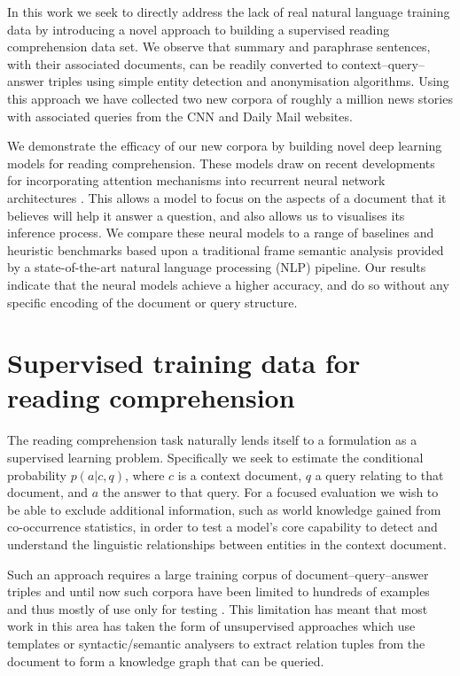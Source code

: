 \documentclass{article}
\begin{document}
In this work we seek to directly address the lack of real natural language
training data by introducing a novel approach to building a supervised reading
comprehension data set. We observe that summary and paraphrase sentences, with
their associated documents, can be readily converted to context--query--answer
triples using simple entity detection and anonymisation algorithms.
Using this approach we have collected two new corpora of roughly a million news
stories with associated queries from the CNN and Daily Mail websites.

We demonstrate the efficacy of our new corpora by building novel deep learning
models for reading comprehension. These models draw on recent developments
for incorporating attention mechanisms into recurrent neural network architectures
\cite{Bahdanau:2014:NMT,Mnih:2014:RMVA,Gregor:2015:DRAW,Sukhbaatar:2015}. This allows a model to
focus on the aspects of a document that it believes will help it answer a
question, and also allows us to visualises its inference process.
We compare these neural models to a range of baselines and heuristic benchmarks
based upon a traditional frame semantic analysis provided by a state-of-the-art
natural language processing (NLP) pipeline. Our results indicate that the neural
models achieve a higher accuracy, and do so without any specific encoding of the
document or query structure.
 \section{Supervised training data for reading comprehension}
\label{data}

The reading comprehension task naturally lends itself to a formulation as a
supervised learning problem. Specifically we seek to estimate the conditional
probability $p(a|c,q)$, where $c$ is a context document, $q$ a query relating to
that document, and $a$ the answer to that query.
For a focused evaluation we wish to be able to exclude additional information,
such as world knowledge gained from co-occurrence statistics, in order to test a
model's core capability to detect and understand the linguistic relationships
between entities in the context document.

Such an approach requires a large training corpus of document--query--answer
triples and until now such corpora have been limited to hundreds of examples and
thus mostly of use only for testing \cite{Richardson:2013:MCT}. This limitation
has meant that most work in this area has taken the form of unsupervised
approaches which use templates or syntactic/semantic analysers to extract
relation tuples from the document to form a knowledge graph that can be queried.
\end{document}
